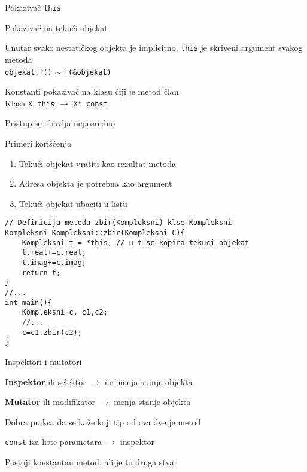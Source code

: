 \documentclass{article}
\newenvironment{xitemize}{%
    
    \itemize
    \larger
}{%
    \enditemize
}
\let\olditemize\itemize
\let\endolditemize\enditemize
\renewenvironment{itemize}{%
    \smaller
    \olditemize
}{%
    \endolditemize
}
\providecommand{\inlinecode}[1]{\texttt{#1}}
\begin{document}
\begin{xitemize}
\item Pokazivač \inlinecode{this}
\begin{itemize}
    \item Pokazivač na tekući objekat
    \item Unutar svako nestatičkog objekta je implicitno, \inlinecode{this} je skriveni argument svakog metoda\\
    \inlinecode{objekat.f()} $\sim$ \inlinecode{f(\&objekat)}
     \item Konstanti pokazivač na klasu čiji je metod član\\
    Klasa \inlinecode{X}, \inlinecode{this} $\rightarrow$ \inlinecode{X* const}
    \item Pristup se obavlja neposredno
    \item Primeri korišćenja
    \begin{enumerate}
        \item Tekući objekat vratiti kao rezultat metoda
        \item Adresa objekta je potrebna kao argument
        \item Tekući objekat ubaciti u listu
    \end{enumerate}
    \begin{lstlisting}
// Definicija metoda zbir(Kompleksni) klse Kompleksni
Kompleksni Kompleksni::zbir(Kompleksni C){
    Kompleksni t = *this; // u t se kopira tekuci objekat
    t.real+=c.real;
    t.imag+=c.imag;
    return t;
}
//...
int main(){
    Kompleksni c, c1,c2;
    //...
    c=c1.zbir(c2);
}
    \end{lstlisting}
\end{itemize}
\item Inspektori i mutatori
\begin{itemize}
    \item \textbf{Inspektor} ili selektor $\rightarrow$ ne menja stanje objekta
    \item \textbf{Mutator} ili modifikator $\rightarrow$ menja stanje objekta
    \item Dobra praksa da se kaže koji tip od ova dve je metod
    \item \inlinecode{const} iza liste parametara $\rightarrow$ inspektor
    \item Postoji konstantan metod, ali je to druga stvar
\end{itemize}


\end{xitemize}
\end{document}
